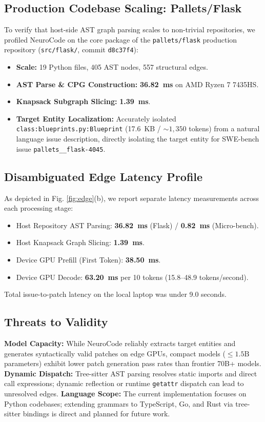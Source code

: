 \documentclass[conference]{IEEEtran}
\begin{document}
\subsection{Production Codebase Scaling: Pallets/Flask}
To verify that host-side AST graph parsing scales to non-trivial repositories, we profiled NeuroCode on the core package of the \texttt{pallets/flask} production repository (\texttt{src/flask/}, commit \texttt{d8c37f4}):
\begin{itemize}
    \item \textbf{Scale:} 19 Python files, 405 AST nodes, 557 structural edges.
    \item \textbf{AST Parse \& CPG Construction:} \textbf{36.82~ms} on AMD Ryzen 7 7435HS.
    \item \textbf{Knapsack Subgraph Slicing:} \textbf{1.39~ms}.
    \item \textbf{Target Entity Localization:} Accurately isolated \texttt{class:blueprints.py:Blueprint} (17.6~KB / $\sim 1,350$ tokens) from a natural language issue description, directly isolating the target entity for SWE-bench issue \texttt{pallets\_\_flask-4045}.
\end{itemize}

\subsection{Disambiguated Edge Latency Profile}
As depicted in Fig. \ref{fig:edge}(b), we report separate latency measurements across each processing stage:
\begin{itemize}
    \item Host Repository AST Parsing: \textbf{36.82~ms} (Flask) / \textbf{0.82~ms} (Micro-bench).
    \item Host Knapsack Graph Slicing: \textbf{1.39~ms}.
    \item Device GPU Prefill (First Token): \textbf{38.50~ms}.
    \item Device GPU Decode: \textbf{63.20~ms} per 10 tokens (15.8--48.9 tokens/second).
\end{itemize}
Total issue-to-patch latency on the local laptop was under 9.0 seconds.

\subsection{Threats to Validity}
\textbf{Model Capacity:} While NeuroCode reliably extracts target entities and generates syntactically valid patches on edge GPUs, compact models ($\le 1.5\text{B}$ parameters) exhibit lower patch generation pass rates than frontier 70B+ models. \textbf{Dynamic Dispatch:} Tree-sitter AST parsing resolves static imports and direct call expressions; dynamic reflection or runtime \texttt{getattr} dispatch can lead to unresolved edges. \textbf{Language Scope:} The current implementation focuses on Python codebases; extending grammars to TypeScript, Go, and Rust via tree-sitter bindings is direct and planned for future work.
\end{document}
